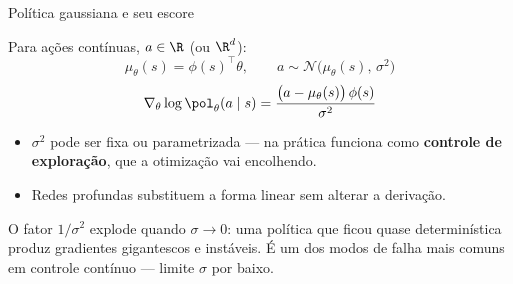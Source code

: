 \documentclass[aspectratio=169, 11pt]{beamer}
\newcommand{\thv}{\theta}                       %
\newcommand{\polth}{\pol_{\thv}}                %
\newcommand{\gth}{\nabla_{\thv}}                %
\newcommand{\feat}{\phi}                        %
\newcommand{\gscore}{\gth \log \polth(a \mid s)} %
\begin{document}
\begin{frame}{Política gaussiana e seu escore}

  Para ações contínuas, $a \in \R$ (ou $\R^d$):
  \[
    \mu_{\thv}(s) = \feat(s)^{\!\top}\thv,
    \qquad
    a \sim \mathcal{N}\bigl(\mu_{\thv}(s),\, \sigma^2\bigr)
  \]
  \[
    \gscore = \frac{\bigl(a - \mu_{\thv}(s)\bigr)\,\feat(s)}{\sigma^2}
  \]

  \begin{itemize}\setlength{\itemsep}{0.35ex}
    \item $\sigma^2$ pode ser fixa ou parametrizada --- na prática funciona
      como \textbf{controle de exploração}, que a otimização vai encolhendo.
    \item Redes profundas substituem a forma linear sem alterar a derivação.
  \end{itemize}

  \begin{alertabox}
    O fator $1/\sigma^2$ explode quando $\sigma \to 0$: uma política que ficou
    quase determinística produz gradientes gigantescos e instáveis. É um dos
    modos de falha mais comuns em controle contínuo --- limite $\sigma$ por
    baixo.
  \end{alertabox}
\end{frame}
\end{document}
